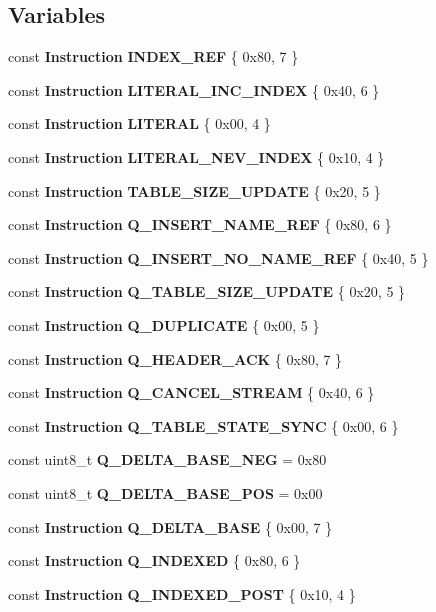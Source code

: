 \subsection*{Variables}
\begin{DoxyCompactItemize}
\item 
const {\bf Instruction} {\bf I\+N\+D\+E\+X\+\_\+\+R\+EF} \{ 0x80, 7 \}
\item 
const {\bf Instruction} {\bf L\+I\+T\+E\+R\+A\+L\+\_\+\+I\+N\+C\+\_\+\+I\+N\+D\+EX} \{ 0x40, 6 \}
\item 
const {\bf Instruction} {\bf L\+I\+T\+E\+R\+AL} \{ 0x00, 4 \}
\item 
const {\bf Instruction} {\bf L\+I\+T\+E\+R\+A\+L\+\_\+\+N\+E\+V\+\_\+\+I\+N\+D\+EX} \{ 0x10, 4 \}
\item 
const {\bf Instruction} {\bf T\+A\+B\+L\+E\+\_\+\+S\+I\+Z\+E\+\_\+\+U\+P\+D\+A\+TE} \{ 0x20, 5 \}
\item 
const {\bf Instruction} {\bf Q\+\_\+\+I\+N\+S\+E\+R\+T\+\_\+\+N\+A\+M\+E\+\_\+\+R\+EF} \{ 0x80, 6 \}
\item 
const {\bf Instruction} {\bf Q\+\_\+\+I\+N\+S\+E\+R\+T\+\_\+\+N\+O\+\_\+\+N\+A\+M\+E\+\_\+\+R\+EF} \{ 0x40, 5 \}
\item 
const {\bf Instruction} {\bf Q\+\_\+\+T\+A\+B\+L\+E\+\_\+\+S\+I\+Z\+E\+\_\+\+U\+P\+D\+A\+TE} \{ 0x20, 5 \}
\item 
const {\bf Instruction} {\bf Q\+\_\+\+D\+U\+P\+L\+I\+C\+A\+TE} \{ 0x00, 5 \}
\item 
const {\bf Instruction} {\bf Q\+\_\+\+H\+E\+A\+D\+E\+R\+\_\+\+A\+CK} \{ 0x80, 7 \}
\item 
const {\bf Instruction} {\bf Q\+\_\+\+C\+A\+N\+C\+E\+L\+\_\+\+S\+T\+R\+E\+AM} \{ 0x40, 6 \}
\item 
const {\bf Instruction} {\bf Q\+\_\+\+T\+A\+B\+L\+E\+\_\+\+S\+T\+A\+T\+E\+\_\+\+S\+Y\+NC} \{ 0x00, 6 \}
\item 
const uint8\+\_\+t {\bf Q\+\_\+\+D\+E\+L\+T\+A\+\_\+\+B\+A\+S\+E\+\_\+\+N\+EG} = 0x80
\item 
const uint8\+\_\+t {\bf Q\+\_\+\+D\+E\+L\+T\+A\+\_\+\+B\+A\+S\+E\+\_\+\+P\+OS} = 0x00
\item 
const {\bf Instruction} {\bf Q\+\_\+\+D\+E\+L\+T\+A\+\_\+\+B\+A\+SE} \{ 0x00, 7 \}
\item 
const {\bf Instruction} {\bf Q\+\_\+\+I\+N\+D\+E\+X\+ED} \{ 0x80, 6 \}
\item 
const {\bf Instruction} {\bf Q\+\_\+\+I\+N\+D\+E\+X\+E\+D\+\_\+\+P\+O\+ST} \{ 0x10, 4 \}
\item 

\end{DoxyCompactItemize}
